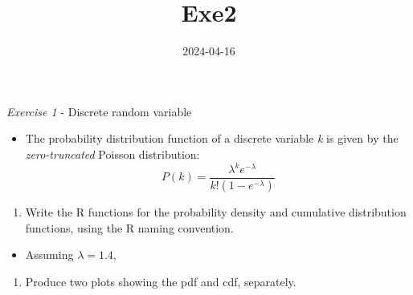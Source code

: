 \documentclass[
]{article}
\title{Exe2}
\author{}
\date{\vspace{-2.5em}2024-04-16}
\providecommand{\tightlist}{%
  \setlength{\itemsep}{0pt}\setlength{\parskip}{0pt}}
\begin{document}
\maketitle

\emph{Exercise 1} - Discrete random variable

\begin{itemize}
\tightlist
\item
  The probability distribution function of a discrete variable \emph{k}
  is given by the \emph{zero-truncated} Poisson distribution: \[
  P(k) = \frac{\lambda^k e^{- \lambda}}{k! (1 - e^{-\lambda})}
  \]
\end{itemize}

\begin{enumerate}
\def\labelenumi{\arabic{enumi})}
\tightlist
\item
  Write the R functions for the probability density and cumulative
  distribution functions, using the R naming convention.
\end{enumerate}

\begin{itemize}
\tightlist
\item
  Assuming \(\lambda = 1.4\),
\end{itemize}

\begin{enumerate}
\def\labelenumi{\arabic{enumi})}
\setcounter{enumi}{1}
\tightlist
\item
  Produce two plots showing the pdf and cdf, separately.
\end{enumerate}
\end{document}
